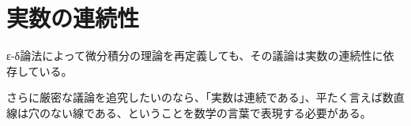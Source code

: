 \documentclass[../math-imaging]{subfiles}
\begin{document}
\chapter{実数の連続性}

ε-δ論法によって微分積分の理論を再定義しても、その議論は実数の連続性に依存している。

さらに厳密な議論を追究したいのなら、「実数は連続である」、平たく言えば数直線は穴のない線である、ということを数学の言葉で表現する必要がある。
\end{document}
